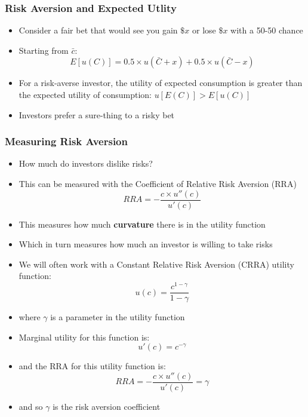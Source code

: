 \documentclass[a4paper,twoside]{article}
\numberwithin{equation}{section}
\numberwithin{figure}{section}
\begin{document}
\subsubsection{Risk Aversion and Expected Utlity}
	\begin{itemize}
		\item Consider a fair bet that would see you gain \( \$x \) or lose \( \$x \) with a 50-50 chance
		\item Starting from \( \bar{c} \):
		\[
			E[u(C)] = 0.5 \times u(\bar{C}+x) + 0.5 \times u(\bar{C}-x)
		\]
		\item For a risk-averse investor, the utility of expected consumption is greater than the expected utility of consumption: \( u[E(C)] > E[u(C)] \)
		\item \textcolor{myblue}{Investors prefer a sure-thing to a risky bet}
	\end{itemize}
\subsubsection{Measuring Risk Aversion}
	\begin{itemize}
		\item How much do investors dislike risks?
		\item This can be measured with the \textcolor{myblue}{Coefficient of Relative Risk Aversion} (RRA)
		\[
			RRA = -\frac{c \times u''(c)}{u'(c)}
		\]
		\item This measures how much \textbf{curvature} there is in the utility function
		\item Which in turn measures how much an investor is willing to take risks
		\item We will often work with a \textcolor{myblue}{Constant Relative Risk Aversion} (CRRA) utility function:
		\[
			u(c) = \frac{c^{1-\gamma}}{1-\gamma}
		\]
		\item where \( \gamma \) is a parameter in the utility function
		\item Marginal utility for this function is:
		\[
			u'(c)=c^{-\gamma}
		\]
		\item and the RRA for this utility function is:
		\[
			RRA = -\frac{c \times u''(c)}{u'(c)} = \gamma
		\]
		\item and so \( \gamma \) is the risk aversion coefficient
	\end{itemize}
\end{document}
